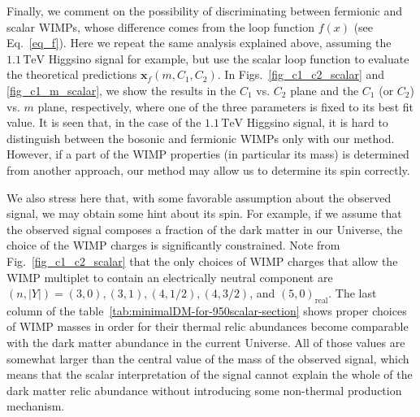 \documentclass[12pt,twoside,book]{article}
\begin{document}
Finally, we comment on the possibility of discriminating between
fermionic and scalar WIMPs, whose difference comes from the loop
function $f(x)$ (see Eq.~\eqref{eq_f}).  Here we repeat the same
analysis explained above, assuming the $1.1\,\mathrm{TeV}$ Higgsino
signal for example, but use the scalar loop function to evaluate the
theoretical predictions $\bm{x}_f (m, C_1, C_2)$.  In
Figs.~\ref{fig_c1_c2_scalar} and \ref{fig_c1_m_scalar}, we show the
results in the $C_1$ vs. $C_2$ plane and the $C_1$ (or $C_2$) vs. $m$
plane, respectively, where one of the three parameters is fixed to its
best fit value.  It is seen that, in the case of the
$1.1\,\mathrm{TeV}$ Higgsino signal, it is hard to distinguish between
the bosonic and fermionic WIMPs only with our method.  However, if a
part of the WIMP properties (in particular its mass) is determined
from another approach, our method may allow us to determine its spin
correctly.

We also stress here that, with some favorable assumption about the
observed signal, we may obtain some hint about its spin.  For example,
if we assume that the observed signal composes a fraction of the dark
matter in our Universe, the choice of the WIMP charges is
significantly constrained.  Note from Fig.~\ref{fig_c1_c2_scalar} that
the only choices of WIMP charges that allow the WIMP multiplet to
contain an electrically neutral component are
$(n,|Y|)=(3,0),(3,1),(4,1/2),(4,3/2)$, and $(5,0)_\text{real}$.  The
last column of the table~\ref{tab:minimalDM-for-950scalar-section} shows proper choices of WIMP masses in order
for their thermal relic abundances become comparable with the dark
matter abundance in the current Universe.  All of those values are
somewhat larger than the central value of the mass of the observed
signal, which means that the scalar interpretation of the signal
cannot explain the whole of the dark matter relic abundance without
introducing some non-thermal production mechanism.
\end{document}

